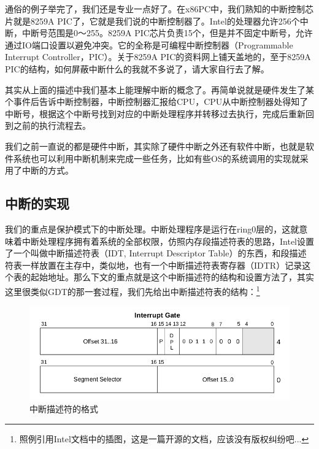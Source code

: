 \par 通俗的例子举完了，我们还是专业一点好了。在x86PC中，我们熟知的中断控制芯片就是8259A PIC了，它就是我们说的中断控制器了。Intel的处理器允许256个中断，中断号范围是0～255。8259A PIC芯片负责15个，但是并不固定中断号，允许通过IO端口设置以避免冲突。它的全称是可编程中断控制器（Programmable Interrupt Controller，PIC）。关于8259A PIC的资料网上铺天盖地的，至于8259A PIC的结构，如何屏蔽中断什么的我就不多说了，请大家自行去了解。

\par 其实从上面的描述中我们基本上能理解中断的概念了。再简单说就是硬件发生了某个事件后告诉中断控制器，中断控制器汇报给CPU，CPU从中断控制器处得知了中断号，根据这个中断号找到对应的中断处理程序并转移过去执行，完成后重新回到之前的执行流程去。

\par 我们之前一直说的都是硬件中断，其实除了硬件中断之外还有软件中断，也就是软件系统也可以利用中断机制来完成一些任务，比如有些OS的系统调用的实现就采用了中断的方式。

\subsection{中断的实现}

\par 我们的重点是保护模式下的中断处理。中断处理程序是运行在ring0层的，这就意味着中断处理程序拥有着系统的全部权限，仿照内存段描述符表的思路，Intel设置了一个叫做中断描述符表（IDT, Interrupt Descriptor Table）的东西，和段描述符表一样放置在主存中，类似地，也有一个中断描述符表寄存器（IDTR）记录这个表的起始地址。那么下文的重点就是这个中断描述符的结构和设置方法了，其实这里很类似GDT的那一套过程，我们先给出中断描述符表的结构：\footnote{照例引用Intel文档中的插图，这是一篇开源的文档，应该没有版权纠纷吧...}

\begin{figure}[ht]
      \centering
      \includegraphics[scale=0.5]{picture/chapt7/interrupt_gate.png}
      \caption{中断描述符的格式}
\end{figure}

